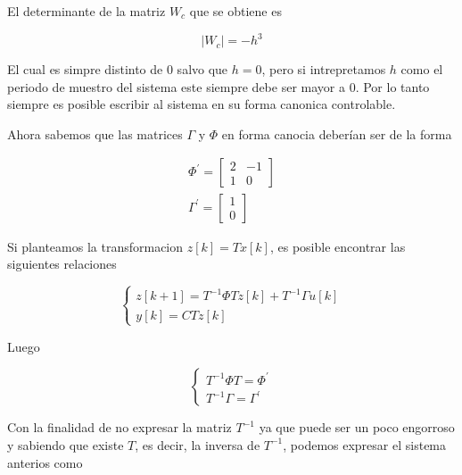 \documentclass{article}
\newcommand{\syseq}[1]{ \left\{  
                            \begin{array}{c}
                                #1
                            \end{array}
                        \right. }
\begin{document}
        El determinante de la matriz $W_c$ que se obtiene es 

        \begin{equation}
            |W_c| = -h^3
        \end{equation}

        El cual es simpre distinto de $0$ salvo que $h=0$, pero si intrepretamos $h$ como el periodo de muestro del sistema este siempre debe ser mayor a $0$. Por lo tanto 
        siempre es posible escribir al sistema en su forma canonica controlable.

        Ahora sabemos que las matrices $\Gamma$ y $\Phi$ en forma canocia deberían ser de la forma 

        \begin{equation}
            \begin{array}{c}
                \Phi^\prime = 
                    \begin{bmatrix}
                        2 & -1 \\ 
                        1 & 0
                    \end{bmatrix}\\
                \Gamma^\prime = 
                    \begin{bmatrix}
                        1 \\ 0
                    \end{bmatrix}
            \end{array}
        \end{equation}

        Si planteamos la transformacion $z[k] = Tx[k]$, es posible encontrar las siguientes relaciones 

        \begin{equation}
            \syseq{
                z[k+1] = T^{-1}\Phi T z[k] + T^{-1}\Gamma u[k] \\ 
                y[k] = C T z[k]    
            }
        \end{equation}

        Luego 

        \begin{equation}
            \syseq{
                T^{-1}\Phi T = \Phi^\prime \\ 
                T^{-1}\Gamma = \Gamma^\prime
            }
        \end{equation}

        Con la finalidad de no expresar la matriz $T^{-1}$ ya que puede ser un poco engorroso y sabiendo que existe $T$, es decir, 
        la inversa de $T^{-1}$, podemos expresar el sistema anterios como 
\end{document}
